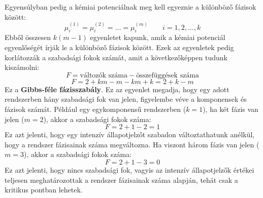 \documentclass[a4paper,12pt]{article}
\begin{document}
Egyensúlyban pedig a kémiai potenciálnak meg kell egyeznie a különböző fázisok között:
\begin{equation}
    \mu_i^{(1)} = \mu_i^{(2)} = \ldots = \mu_i^{(m)} \qquad i = 1, 2, \ldots, k
\end{equation}
Ebből összesen $k(m - 1)$ egyenletet kapunk, amik a kémiai potenciál egyenlőségét írják le a különböző fázisok között.
Ezek az egyenletek pedig korlátozzák a szabadsági fokok számát, amit a következőképpen tudunk kiszámolni:
\begin{equation}
    F = \text{változók száma} - \text{összefüggések száma}
\end{equation}
\begin{equation}
    F = 2 + km - m - km + k = 2 + k - m
\end{equation}
Ez a \textbf{Gibbs-féle fázisszabály}. Ez az egyenlet megadja, hogy egy adott rendszerben hány szabadsági fok van jelen, figyelembe véve a komponensek és fázisok számát.
Például egy egykomponensű rendszerben ($k=1$), ha két fázis van jelen ($m=2$), akkor a szabadsági fokok száma:
\begin{equation}
    F = 2 + 1 - 2 = 1
\end{equation}
Ez azt jelenti, hogy egy intenzív állapotjelzőt szabadon változtathatunk anélkül, hogy a rendszer fázisainak száma megváltozna. Ha viszont három fázis van jelen ($m=3$), akkor a szabadsági fokok száma:
\begin{equation}
    F = 2 + 1 - 3 = 0
\end{equation}
Ez azt jelenti, hogy nincs szabadsági fok, vagyis az intenzív állapotjelzők értékei teljesen meghatározottak a rendszer fázisainak száma alapján, tehát csak a kritikus pontban lehetek.
\end{document}
